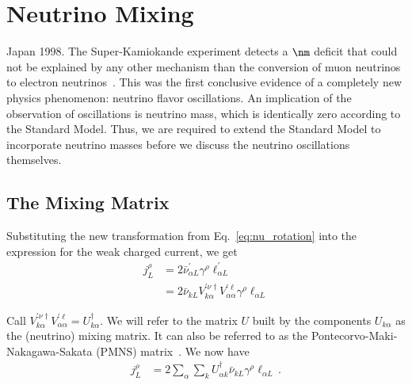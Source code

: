 \section{Neutrino Mixing}\label{ch:oscillation}
Japan 1998. The Super-Kamiokande experiment detects a $\nm$ deficit that could not be explained by any other mechanism
than the conversion of muon neutrinos to electron neutrinos~\cite{sk1998}. This was the first conclusive evidence of a completely new physics phenomenon: neutrino flavor
oscillations. An implication of the observation of oscillations is neutrino mass, 
which is identically zero according to the Standard Model. Thus, we are required to extend the Standard Model to incorporate neutrino 
masses before we discuss the neutrino oscillations themselves.

\subsection{The Mixing Matrix}
Substituting the new transformation from Eq.~\ref{eq:nu_rotation} into the expression for the weak charged current, we get
\begin{align}\label{eq:j_CC2}
    j^\rho_L &= 2\bar{\nu}^\prime_{\alpha L} \gamma^\rho \ell_{\alpha L}^\prime \nonumber \\
             &= 2\bar{\nu}_{k L} V^{\prime \nu \dagger}_{k \alpha}V^{\prime \ell}_{\alpha \alpha} \gamma^\rho  \ell_{\alpha L}
\end{align}

Call $V^{\prime \nu \dagger}_{k \alpha}V^{\prime \ell}_{\alpha \alpha} = U^\dagger_{k \alpha}$. We will refer to the matrix $U$ built by the components $U_{k \alpha}$ as the (neutrino) mixing matrix. It can also be referred to as the 
Pontecorvo-Maki-Nakagawa-Sakata (PMNS) matrix~\cite{pontecorvo1957,maki1962}.
We now have 
\begin{align}\label{eq:j_CC3}
    j^\rho_L &= 2 \sum_\alpha \sum_k U^\dagger_{\alpha k} \bar{\nu}_{k L} \gamma^\rho  \ell_{\alpha L}\,.
\end{align}

